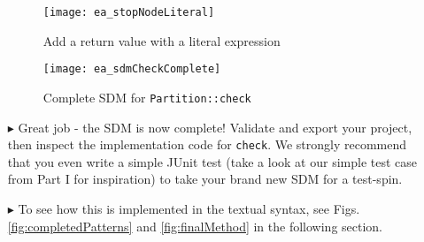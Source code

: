 \begin{itemize}
\begin{figure}[htbp]
\begin{center}
  \texttt{[image: ea\_stopNodeLiteral]}
  \caption{Add a return value with a literal expression}
  \label{fig:sdm_check_literal_exp}
\end{center}
\end{figure}

\begin{figure}[htbp]
\begin{center}
  \texttt{[image: ea\_sdmCheckComplete]}
  \caption{Complete SDM for \texttt{Partition::check}}
  \label{fig:sdm_check_finish}
\end{center}
\end{figure}

\clearpage

\item[$\blacktriangleright$] Great job - the SDM is now complete! Validate and export your project, then inspect the implementation code for \texttt{check}. We
strongly recommend that you even write a simple JUnit test (take a look at our simple test case from Part I for inspiration) to take your brand new SDM for a
test-spin.

\item[$\blacktriangleright$] To see how this is implemented in the textual syntax, see Figs. \ref{fig:completedPatterns} and \ref{fig:finalMethod} in the
following section.


\end{itemize}
